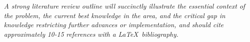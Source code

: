 \textit{A strong literature review outline will succinctly illustrate the essential context of the problem, the current best knowledge in the area, and the critical gap in knowledge restricting further advances or implementation, and should cite approximately 10-15 references with a \LaTeX ~bibliography.}




